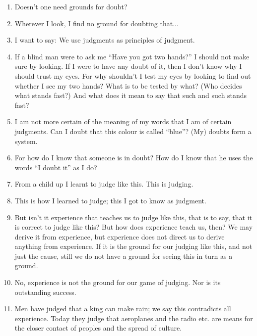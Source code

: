 \documentclass{book}
\begin{document}
\begin{enumerate}
\item
Doesn't one need grounds for doubt?

\item
Wherever I look, I find no ground for doubting that...

\item
I want to say: We use judgments as principles of judgment.

\item
If a blind man were to ask me ``Have you got two hands?'' I should not make
sure by looking. If I were to have any doubt of it, then I don't know why I
should trust my eyes. For why shouldn't I test my eyes by looking to find out
whether I see my two hands? What is to be tested by what? (Who decides what
stands fast?) And what does it mean to say that such and such stands fast?

\item
I am not more certain of the meaning of my words that I am of certain
judgments. Can I doubt that this colour is called ``blue''?  (My) doubts form a
system.

\item
For how do I know that someone is in doubt? How do I know that he uses the
words ``I doubt it'' as I do?

\item
From a child up I learnt to judge like this. This is judging.

\item
This is how I learned to judge; this I got to know as judgment.

\item
But isn't it experience that teaches us to judge like this, that is to say,
that it is correct to judge like this? But how does experience teach us, then?
We may derive it from experience, but experience does not direct us to derive
anything from experience. If it is the ground for our judging like this, and
not just the cause, still we do not have a ground for seeing this in turn as a
ground.

\item
No, experience is not the ground for our game of judging. Nor is its
outstanding success.

\item
Men have judged that a king can make rain; we say this contradicts all
experience. Today they judge that aeroplanes and the radio etc. are means for
the closer contact of peoples and the spread of culture.


\end{enumerate}
\end{document}
